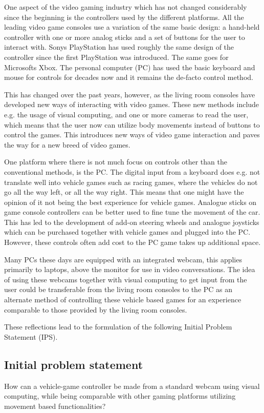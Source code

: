 One aspect of the video gaming industry which has not changed considerably since the beginning is the controllers used by the different platforms. All the leading video game consoles use a variation of the same basic design: a hand-held controller with one or more analog sticks and a set of buttons for the user to interact with. Sonys PlayStation has used roughly the same design of the controller since the first PlayStation was introduced. The same goes for Microsofts Xbox. The personal computer (PC) has used the basic keyboard and mouse for controls for decades now and it remains the de-facto control method.
\bigskip

This has changed over the past years, however, as the living room consoles have developed new ways of interacting with video games. These new methods include e.g. the usage of visual computing, and one or more cameras to read the user, which means that the user now can utilize body movements instead of buttons to control the games. This introduces new ways of video game interaction and paves the way for a new breed of video games.
\bigskip

One platform where there is not much focus on controls other than the conventional methods, is the PC. The digital input from a keyboard does e.g. not translate well into vehicle games such as racing games, where the vehicles do not go all the way left, or all the way right. This means that one might have the opinion of it not being the best experience for vehicle games. Analogue sticks on game console controllers can be better used to fine tune the movement of the car. This has led to the development of add-on steering wheels and analogue joysticks which can be purchased together with vehicle games and plugged into the PC. However, these controls often add cost to the PC game takes up additional space.
\bigskip

Many PCs these days are equipped with an integrated webcam, this applies primarily to laptops, above the monitor for use in video conversations. The idea of using these webcams together with visual computing to get input from the user could be transferable from the living room consoles to the PC as an alternate method of controlling these vehicle based games for an experience comparable to those provided by the living room consoles.

\noindent These reflections lead to the formulation of the following Initial Problem Statement (IPS).

\subsection{Initial problem statement}
How can a vehicle-game controller be made from a standard webcam using visual computing, while being comparable with other gaming platforms utilizing movement based functionalities?